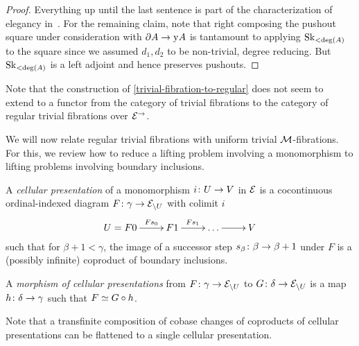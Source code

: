 \documentclass[reqno,10pt,a4paper,oneside,draft]{amsart}
\begin{document}
\begin{proof}
Everything up until the last sentence is part of the characterization of elegancy in~\cite[Proposition~3.8]{bergner-rezk-elegant}.
For the remaining claim, note that right composing the pushout square under consideration with $\partial A \to \yon A$ is tantamount to applying $\Sk_{<\deg(A)}$ to the square since we assumed $d_1, d_2$ to be non-trivial, \ie degree reducing.
But $\Sk_{<\deg(A)}$ is a left adjoint and hence preserves pushouts.
\end{proof}

Note that the construction of \cref{trivial-fibration-to-regular} does not seem to extend to a functor from the category of trivial fibrations to the category of regular trivial fibrations over $\catE^{\to}$.

\medskip

We will now relate regular trivial fibrations with uniform trivial $\cal{M}$-fibrations.
For this, we review how to reduce a lifting problem involving a monomorphism to lifting problems involving boundary inclusions.

\begin{definition}
A \emph{cellular presentation} of a monomorphism $i \co U \to V$ in $\catE$ is a cocontinuous ordinal-indexed diagram $F \co \gamma \to \catE_{\backslash U}$ with colimit $i$
\[
\xymatrix{
  U = F 0
  \ar[r]^-{F s_0}
&
  F 1
  \ar[r]^{F s_1}
&
  \ldots
  \ar[r]
&
  V
}
\]
such that for $\beta + 1 < \gamma$, the image of a successor step $s_{\beta} \co \beta \to \beta + 1$ under $F$ is a (possibly infinite) coproduct of boundary inclusions.

A \emph{morphism of cellular presentations} from $F \co \gamma \to \cal{E}_{\backslash U}$ to $G \co \delta \to \cal{E}_{\backslash U}$ is a map $h \co \delta \to \gamma$ such that $F \simeq G \cc h$.
\end{definition}

Note that a transfinite composition of cobase changes of coproducts of cellular presentations can be flattened to a single cellular presentation.
\end{document}
